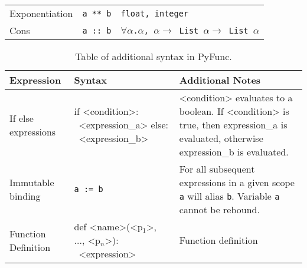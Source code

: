 \documentclass{l4proj}
\begin{document}
\begin{table}[h!]
\begin{center}
\begin{tabular}{@{}|l|l|l|@{}}
    Exponentiation        & \texttt{a ** b}       &   \texttt{float, integer} \\
    Cons                  & \texttt{a :: b}       &   \texttt{$\forall \alpha$.$\alpha$, $\alpha \rightarrow$ List $\alpha \rightarrow$ List $\alpha$} \\
    \hline
    \end{tabular}
    \end{center}
\end{table}


\begin{table}[!h]
    \caption{Table of additional syntax in PyFunc.}
    \begin{center}

    \begin{tabular}{@{}|l|p{5cm}|p{4cm}|@{}}
        \hline
        \textbf{Expression}  &   \textbf{Syntax}     &   \textbf{Additional Notes}   \\
        \hline
        \hline
        If else expressions & if <condition>: \newline \-\ <expression\_a> \newline else: \newline \-\ <expression\_b> & <condition> evaluates to a boolean. If <condition> is true, then expression\_a is evaluated, otherwise expression\_b is evaluated.\\
        \hline
        Immutable binding   & \texttt{a := b}   & For all subsequent expressions in a given scope \texttt{a} will alias \texttt{b}. Variable \texttt{a} cannot be rebound. \\
        \hline
        Function Definition & def <name>(<p$_1$>, ..., <p$_n$>): \newline \-\ <expression> & Function definition\\
        \hline
        
    \end{tabular}
    \end{center}
\end{table}
\end{document}
